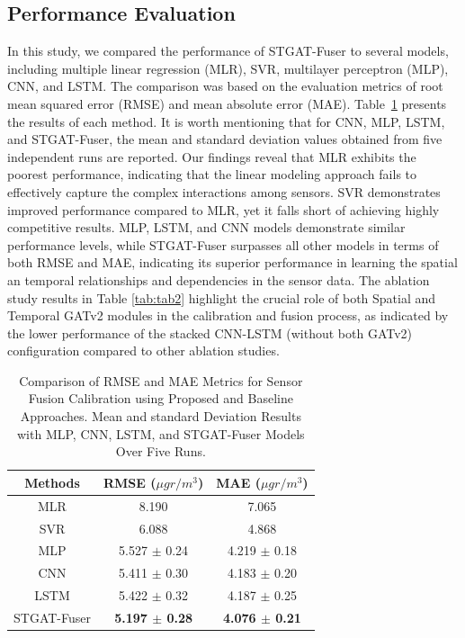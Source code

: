 \documentclass[conference,a4paper]{IEEEtran}
\begin{document}

\subsection{Performance Evaluation}
In this study, we compared the performance of STGAT-Fuser  to several models, including multiple linear regression (MLR), SVR, multilayer perceptron (MLP), CNN, and LSTM. The comparison was based on the evaluation metrics of root mean squared error (RMSE) and mean absolute error (MAE). Table~\ref{tab:tab1} presents the results of each method. It is worth mentioning that for CNN, MLP, LSTM, and STGAT-Fuser, the mean and standard deviation values obtained from five independent runs are reported. Our findings reveal that MLR exhibits the poorest performance, indicating that the linear modeling approach fails to effectively capture the complex interactions among sensors. SVR demonstrates improved performance compared to MLR, yet it falls short of achieving highly competitive results. MLP, LSTM, and CNN models demonstrate similar performance levels, while STGAT-Fuser surpasses all other models in terms of both RMSE and MAE, indicating its superior performance in learning the spatial an temporal relationships and dependencies in the sensor data. The ablation study results in Table \ref{tab:tab2} highlight the crucial role of both Spatial and Temporal GATv2 modules in the calibration and fusion process, as indicated by the lower performance of the stacked CNN-LSTM (without both GATv2) configuration compared to other ablation studies.

\begin{table}
    \begin{center}
    \caption{Comparison of RMSE and MAE Metrics for Sensor Fusion Calibration using Proposed and Baseline Approaches.  Mean and standard Deviation Results with MLP, CNN, LSTM, and STGAT-Fuser Models Over Five Runs.}
    \label{tab:tab1}
\begin{tabular}{ccc} \toprule
    {Methods} & {RMSE ($\mu gr / m^3$)} & {MAE ($\mu gr / m^3$)} \\ \midrule
    MLR  & 8.190 & 7.065  \\
    SVR  & 6.088  & 4.868   \\
    MLP  & 5.527 $\pm$ 0.24  & 4.219 $\pm$ 0.18 \\
    CNN  & 5.411 $\pm$ 0.30  & 4.183 $\pm$ 0.20\\ 
    LSTM  & 5.422 $\pm$ 0.32  & 4.187 $\pm$ 0.25 \\
    STGAT-Fuser  & \textbf{5.197 $\pm$ 0.28}  & \textbf{4.076 $\pm$ 0.21}  \\ \bottomrule
\end{tabular}
\end{center}
\end{table}
\end{document}
